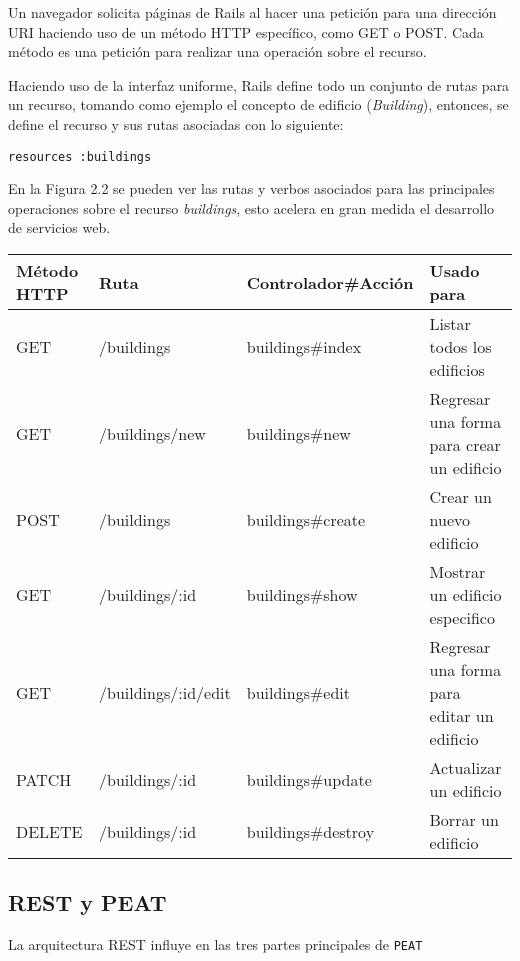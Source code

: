 Un navegador solicita páginas de Rails al hacer una petición para una dirección URI
haciendo uso de un método HTTP específico, como GET o POST. Cada método es una
petición para realizar una operación sobre el recurso.

Haciendo uso de la interfaz uniforme, Rails define todo un conjunto de rutas
para un recurso, tomando como ejemplo el concepto de edificio (\textit{Building}),
entonces, se define el recurso y sus rutas asociadas con lo siguiente:

\begin{verbatim}
resources :buildings
\end{verbatim}

En la Figura 2.2 se pueden ver las rutas y verbos asociados para las principales
operaciones sobre el recurso \textit{buildings}, esto acelera en gran medida
el desarrollo de servicios web.

\begin{center}
  \begin{tabular}{|m{1.2cm}|m{2.5cm}|m{3cm}|m{3.5cm}|}
    \hline
    Método HTTP & Ruta & Controlador\#Acción & Usado para \\
    \hline\hline
    GET & /buildings & buildings\#index & Listar todos los edificios\\
    \hline
    GET & /buildings/new & buildings\#new & Regresar una forma para crear un edificio\\ [2ex]
    \hline
    POST & /buildings & buildings\#create & Crear un nuevo edificio\\
    \hline
    GET & /buildings/:id & buildings\#show & Mostrar un edificio especifico\\
    \hline
    GET & /buildings/:id/edit & buildings\#edit & Regresar una forma para editar un edificio\\
    \hline
    PATCH & /buildings/:id & buildings\#update & Actualizar un edificio\\
    \hline
    DELETE & /buildings/:id & buildings\#destroy & Borrar un edificio\\
    \hline
  \end{tabular}
\end{center}


\subsection{REST y PEAT}
La arquitectura REST influye en las tres partes principales de \texttt{PEAT}

